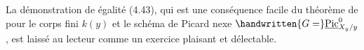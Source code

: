 La démonstration de égalité (4.43), qui est une conséquence facile du
\reversemarginpar{}\normalmarginpar
théorème de   pour le corps fini $k(y)$ et le schéma de Picard nexe $\handwritten{G=}\underline{\mathrm{Pic}}^{0}_{X_{y}/y}$, est laissé au lecteur comme un exercice plaisant et délectable.
\clearpage
